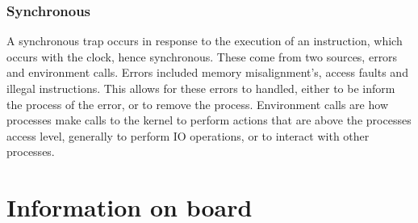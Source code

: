 \subsubsection{Synchronous}
A synchronous trap occurs in response to the execution of an instruction, which occurs with the clock, hence synchronous. These come from two sources, errors and environment calls. Errors included memory misalignment's, access faults and illegal instructions. This allows for these errors to handled, either to be inform the process of the error, or to remove the process. Environment calls are how processes make calls to the kernel to perform actions that are above the processes access level, generally to perform IO operations, or to interact with other processes.
\section{Information on board}